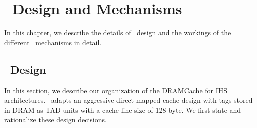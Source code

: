 \chapter{\cachename\ Design and Mechanisms} \label{chap:hashcache}
In this chapter, we describe the details of \cachename\ design and the workings of the different \cachename\ mechanisms in detail.
\section{\cachename\ Design} \label{design}
In this section, we describe our organization of the DRAMCache for IHS architectures. \cachename\ adapts an aggressive direct mapped cache design with tags stored in DRAM as TAD units \cite{alloy} with a cache line size of 128 byte. We first state and rationalize these design decisions.

